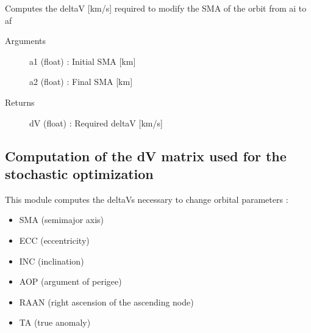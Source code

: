 \documentclass[letterpaper,10pt,english]{sphinxmanual}
\begin{document}

\begin{fulllineitems}
\label{\detokenize{regroupement/dV_computations:regroupement.dV_computations.maneuvers_dV.SMA_dV}}
Computes the delta\sphinxhyphen{}V {[}km/s{]} required to modify the SMA of the orbit from ai to af
\begin{description}
\item[{Arguments}] \leavevmode{[}{]}
a1 (float) : Initial SMA {[}km{]}

a2 (float) : Final SMA {[}km{]}

\item[{Returns}] \leavevmode{[}{]}
dV (float) : Required delta\sphinxhyphen{}V {[}km/s{]}

\end{description}

\end{fulllineitems}



\subsection{Computation of the dV matrix used for the stochastic optimization}
\label{\detokenize{regroupement/dV_computations:computation-of-the-dv-matrix-used-for-the-stochastic-optimization}}\label{\detokenize{regroupement/dV_computations:module-0}}
This module computes the delta\sphinxhyphen{}Vs necessary to change orbital parameters :
\begin{itemize}
\item {} 
SMA (semi\sphinxhyphen{}major axis)

\item {} 
ECC (eccentricity)

\item {} 
INC (inclination)

\item {} 
AOP (argument of perigee)

\item {} 
RAAN (right ascension of the ascending node)

\item {} 
TA (true anomaly)

\end{itemize}
\end{document}
